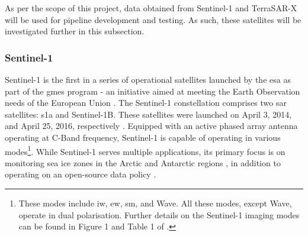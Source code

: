 As per the scope of this project, data obtained from Sentinel-1 and TerraSAR-X will be used for pipeline development and testing. As such, these satellites will be investigated further in this subsection.

\subsubsection{Sentinel-1} \label{sybsubsec:litReview.sarCharac.satellites.sentinel}


Sentinel-1 is the first in a series of operational satellites launched by the \ac{esa} as part of the \ac{gmes} program - an initiative aimed at meeting the Earth Observation needs of the European Union \cite{Attema2009}. The Sentinel-1 constellation comprises two \acs{sar} satellites: \ac{s1a} and Sentinel-1B. These satellites were launched on April 3, 2014, and April 25, 2016, respectively \cite{Geudtner2014, Potin2019}. Equipped with an active phased array antenna operating at C-Band frequency, Sentinel-1 is capable of operating in various modes\footnote{These modes include \acf{iw}, \acf{ew}, \acf{sm}, and Wave. All these modes, except Wave, operate in dual polarisation. Further details on the Sentinel-1 imaging modes can be found in Figure 1 and Table 1 of \cite{Geudtner2014}.}. While Sentinel-1 serves multiple applications, its primary focus is on monitoring sea ice zones in the Arctic and Antarctic regions \cite{Attema2009, Geudtner2014}, in addition to operating on an open-source data policy \cite{Potin2019}.

